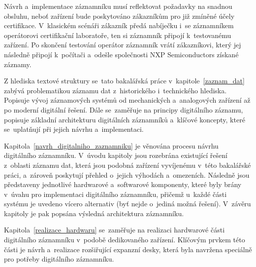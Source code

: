 Návrh a~implementace záznamníku musí reflektovat požadavky na snadnou obsluhu, neboť zařízení bude poskytováno zákazníkům pro již zmíněné účely certifikace. V~klasickém scénáři zákazník předá nabíječku i~se záznamníkem operátorovi certifikační laboratoře, ten si záznamník připojí k~testovanému zařízení. Po skončení testování operátor záznamník vrátí zákazníkovi, který jej následně připojí k~počítači a~odešle společnosti NXP Semiconductors získané záznamy.

Z hlediska textové struktury se~tato bakalářská práce v~kapitole~\ref{zaznam_dat} zabývá problematikou záznamu dat z~historického i~technického hlediska. Popisuje vývoj záznamových systémů od mechanických a~analogových zařízení až po moderní digitální řešení. Dále se~zaměřuje na principy digitálního záznamu, popisuje základní architekturu digitálních záznamníků a~klíčové koncepty, které se~uplatňují při jejich návrhu a~implementaci.

Kapitola~\ref{navrh_digitalniho_zaznamniku} je věnována procesu návrhu digitálního záznamníku. V~úvodu kapitoly jsou rozebrána existující řešení z~oblasti záznamu dat, která jsou podobná zařízení vyvíjenému v~této bakalářské práci, a~zároveň poskytují přehled o~jejich výhodách a~omezeních. Následně jsou představeny jednotlivé hardwarové a~softwarové komponenty, které byly brány v~úvahu pro implementaci digitálního záznamníku, přičemž u~každé části systému je uvedeno vícero alternativ (byť nejde o~jediná možná řešení). V~závěru kapitoly je pak popsána výsledná architektura záznamníku.

Kapitola~\ref{realizace_hardwaru} se~zaměřuje na realizaci hardwarové části digitálního záznamníku v~podobě dedikovaného zařízení. Klíčovým prvkem této části je návrh a~realizace rozšiřující expanzní desky, která byla navržena speciálně pro potřeby digitálního záznamníku.



